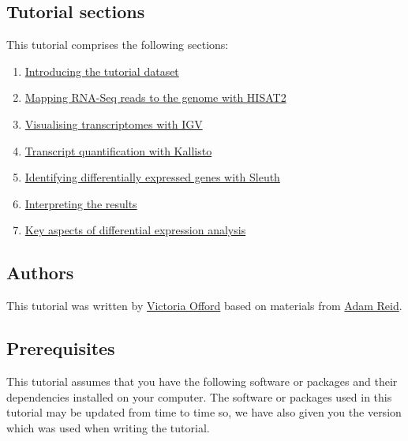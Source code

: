 \documentclass[11pt]{article}
\providecommand{\tightlist}{%
      \setlength{\itemsep}{0pt}\setlength{\parskip}{0pt}}
\begin{document}
    \hypertarget{tutorial-sections}{%
\subsection{Tutorial sections}\label{tutorial-sections}}

This tutorial comprises the following sections:

\begin{enumerate}
\def\labelenumi{\arabic{enumi}.}
\tightlist
\item
  \href{dataset-intro.ipynb}{Introducing the tutorial dataset}
\item
  \href{genome-mapping.ipynb}{Mapping RNA-Seq reads to the genome with
  HISAT2}
\item
  \href{transcriptome-visualisation.ipynb}{Visualising transcriptomes
  with IGV}
\item
  \href{transcript-quantification.ipynb}{Transcript quantification with
  Kallisto}
\item
  \href{sleuth-de.ipynb}{Identifying differentially expressed genes with
  Sleuth}
\item
  \href{de-interpretation.ipynb}{Interpreting the results}
\item
  \href{key-aspects.ipynb}{Key aspects of differential expression
  analysis}
\end{enumerate}

    \hypertarget{authors}{%
\subsection{Authors}\label{authors}}

This tutorial was written by \href{https://github.com/vaofford}{Victoria
Offord} based on materials from
\href{https://www.sanger.ac.uk/people/directory/reid-adam-james}{Adam
Reid}.

\newpage

    \hypertarget{prerequisites}{%
\subsection{Prerequisites}\label{prerequisites}}

This tutorial assumes that you have the following software or packages
and their dependencies installed on your computer. The software or
packages used in this tutorial may be updated from time to time so, we
have also given you the version which was used when writing the
tutorial.
\end{document}
